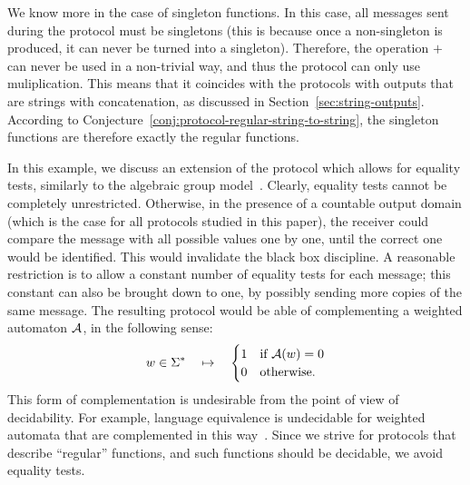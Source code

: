 \begin{myexample}
    We know more in the case of singleton functions. In this case, all messages sent during the protocol must be singletons (this is because once a non-singleton is produced, it can never be turned into a singleton). Therefore, the operation $+$ can never be used in a non-trivial way, and thus the protocol can only use muliplication. This means that it coincides with the protocols with outputs that are strings with concatenation, as discussed in Section~\ref{sec:string-outputs}. According to Conjecture~\ref{conj:protocol-regular-string-to-string}, the singleton functions are therefore exactly the regular functions.
\end{myexample}

\begin{myexample}
\label{ex:equality-tests} In this example, we discuss an extension of the protocol which allows for equality tests, similarly to the algebraic group model~\cite{fuchsbauer2018algebraic}. Clearly, equality tests cannot be completely unrestricted. Otherwise, in the presence of a countable output domain (which is the case for all protocols studied in this paper), the receiver could compare the message with all possible values one by one, until the correct one would be identified. This would  invalidate the black box discipline. A reasonable restriction is to allow a constant number of equality tests for each message; this constant can also be brought  down to one, by possibly sending more copies of the same message. The resulting protocol would be able of complementing a weighted automaton ${\mathcal A}$, in the following sense:
\begin{align*}
w \in \Sigma^* 
\quad \mapsto \quad 
\begin{cases}
    1 & \text{if ${\mathcal A}(w) =0$}\\
    0 & \text{otherwise}.
\end{cases}
\end{align*}
This form of complementation is undesirable from the point of view of decidability. For example, language equivalence is undecidable for weighted automata that are complemented in this way~\cite[Theorem 4.9]{bojanczyk_automata_2025}. Since we strive for protocols that describe ``regular'' functions, and such functions should be decidable, we avoid equality tests.
\end{myexample}


